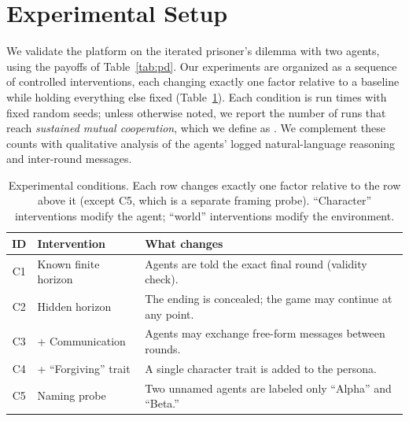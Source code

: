 \section{Experimental Setup}
\label{sec:setup}

We validate the platform on the iterated prisoner's dilemma with two agents, using the payoffs of Table~\ref{tab:pd}. Our experiments are organized as a sequence of controlled interventions, each changing exactly one factor relative to a baseline while holding everything else fixed (Table~\ref{tab:conditions}). Each condition is run  times with fixed random seeds; unless otherwise noted, we report the number of runs that reach \emph{sustained mutual cooperation}, which we define as . We complement these counts with qualitative analysis of the agents' logged natural-language reasoning and inter-round messages.

\begin{table}[t]
  \caption{Experimental conditions. Each row changes exactly one factor relative to the row above it (except C5, which is a separate framing probe). ``Character'' interventions modify the agent; ``world'' interventions modify the environment.}
  \label{tab:conditions}
  \begin{tabular}{@{}clp{4.6cm}@{}}
    \toprule
    ID & Intervention & What changes \\
    \midrule
    C1 & Known finite horizon & Agents are told the exact final round (validity check). \\
    C2 & Hidden horizon & The ending is concealed; the game may continue at any point. \\
    C3 & + Communication & Agents may exchange free-form messages between rounds. \\
    C4 & + ``Forgiving'' trait & A single character trait is added to the persona. \\
    C5 & Naming probe & Two unnamed agents are labeled only ``Alpha'' and ``Beta.'' \\
    \bottomrule
  \end{tabular}
\end{table}

